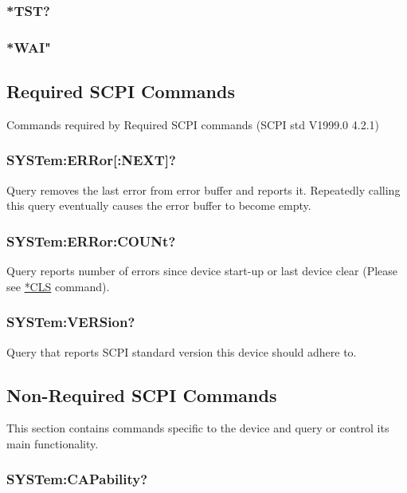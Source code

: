 \documentclass[a4paper,10pt]{article}
\begin{document}
    \subsubsection{*TST?}
    \subsubsection{*WAI"}
    
\subsection{Required SCPI Commands}
    \begin{description}
        \item Commands required by Required SCPI commands (SCPI std V1999.0 4.2.1) 
    \end{description}

        \subsubsection{SYSTem:ERRor[:NEXT]?}
            Query removes the last error from error buffer and reports it. Repeatedly calling this query eventually causes the error buffer to become empty.
        \subsubsection{SYSTem:ERRor:COUNt?}
            Query reports number of errors since device start-up or last device clear (Please see \hyperlink{cls}{*CLS} command).
        \subsubsection{SYSTem:VERSion?}
            Query that reports SCPI standard version this device should adhere to.

\subsection{Non-Required SCPI Commands}
    \begin{description}
        \item This section contains commands specific to the device and query or control its main functionality.
    \end{description}
        \subsubsection{SYSTem:CAPability?}
\end{document}
